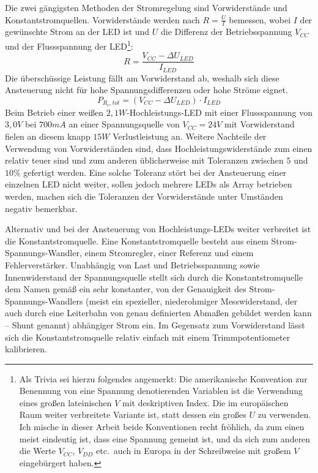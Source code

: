 \documentclass[12pt,a4paper,notitlepage]{article}
\begin{document}
Die zwei gängigsten Methoden der Stromregelung sind Vorwiderstände und Konstantstromquellen. Vorwiderstände werden nach $R=\frac{U}{I}$ bemessen, wobei $I$ der gewünschte Strom an der \gls{LED} ist und $U$ die Differenz der Betriebsspannung $V_{CC}$ und der \gls{Flussspannung} der \gls{LED}\footnote{Als Trivia sei hierzu folgendes angemerkt: Die amerikanische Konvention zur Benennung von eine Spannung denotierenden Variablen ist die Verwendung eines großen lateinischen $V$ mit deskriptiven Index. Die im europäischen Raum weiter verbreitete Variante ist, statt dessen ein großes $U$ zu verwenden. Ich mische in dieser Arbeit beide Konventionen recht fröhlich, da zum einen meist eindeutig ist, dass eine Spannung gemeint ist, und da sich zum anderen die Werte $V_{CC}$, $V_{DD}$ etc.\ auch in Europa in der Schreibweise mit großem $V$ eingebürgert haben.}:
\begin{equation}
R=\frac{V_{CC}-\Delta U_{LED}}{I_{LED}}
\end{equation}
Die überschüssige Leistung fällt am Vorwiderstand ab, weshalb sich diese Ansteuerung nicht für hohe Spannungsdifferenzen oder hohe Ströme eignet.
\begin{equation}
P_{R_v,tot}=\left(V_{CC}-\Delta U_{LED}\right)\cdot I_{LED}
\end{equation}
Beim Betrieb einer weißen $2,1W$-Hochleistungs-\gls{LED} mit einer Flussspannung von $3,0V$ bei $700mA$ an einer Spannungsquelle von $V_{CC}=24V$ mit Vorwiderstand fielen an diesem knapp $15W$ Verlustleistung an.
Weitere Nachteile der Verwendung von Vorwiderständen sind, dass Hochleistungswiderstände zum einen relativ teuer sind und zum anderen üblicherweise mit Toleranzen zwischen $5$ und $10\%$ gefertigt werden. Eine solche Toleranz stört bei der Ansteuerung einer einzelnen \gls{LED} nicht weiter, sollen jedoch mehrere \glspl{LED} als Array betrieben werden, machen sich die Toleranzen der Vorwiderstände unter Umständen negativ bemerkbar.

Alternativ und bei der Ansteuerung von Hochleistungs-\glspl{LED} weiter verbreitet ist die Konstantstromquelle. Eine Konstantstromquelle besteht aus einem Strom-Spannungs-Wandler, einem Stromregler, einer Referenz und einem Fehlerverstärker. Unabhängig von Last und Betriebsspannung sowie Innenwiderstand der Spannungsquelle stellt sich durch die Konstantstromquelle dem Namen gemäß ein sehr konstanter, von der Genauigkeit des Strom-Spannungs-Wandlers (meist ein spezieller, niederohmiger Messwiderstand, der auch durch eine Leiterbahn von genau definierten Abmaßen gebildet werden kann -- \gls{Shunt} genannt) abhängiger Strom ein. Im Gegensatz zum Vorwiderstand lässt sich die Konstantstromquelle relativ einfach mit einem Trimmpotentiometer kalibrieren.
\end{document}
